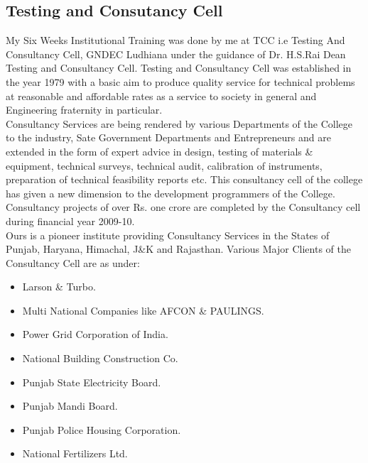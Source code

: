 \subsection{Testing and Consutancy Cell}
My Six Weeks Institutional Training was done by me at TCC i.e Testing And
Consultancy Cell,
GNDEC Ludhiana under the guidance of Dr. H.S.Rai Dean Testing and Consultancy Cell.
Testing and Consultancy Cell was established in the year 1979 with a basic aim to produce
quality service for technical problems at reasonable and affordable rates as a service to society
in general and Engineering fraternity in particular.\\
\hspace{-1.7em} Consultancy Services are being rendered by various Departments of the College to the
industry, Sate Government Departments and Entrepreneurs and are extended in the form of
expert advice in design, testing of materials \& equipment, technical surveys, technical audit,
calibration of instruments, preparation of technical feasibility reports etc.
This consultancy cell of the college has given a new dimension to the development
programmers of the College. Consultancy projects of over Rs. one crore are completed by the
Consultancy cell during financial year 2009-10. \\
Ours is a pioneer institute providing Consultancy Services in the States of Punjab, Haryana,
Himachal, J\&K and Rajasthan. Various Major Clients of the Consultancy Cell are as under:\\
\begin{itemize}
\item Larson \& Turbo.
\item Multi National Companies like AFCON \& PAULINGS.
\item Power Grid Corporation of India.
\item National Building Construction Co.
\item Punjab State Electricity Board.
\item Punjab Mandi Board.
\item Punjab Police Housing Corporation.
\item National Fertilizers Ltd.
\end{itemize}

